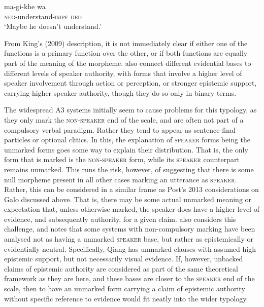 \begin{exe}
        \ex\label{e:Description:DhimalDeductive}
        \gll ma-gi-khe wa \\
        \textsc{neg}-understand-\textsc{impf} \textsc{ded} \\
        \glt `Maybe he doesn't understand.' \cite[Dhimal,][245]{King2009}
\end{exe}

From King's (2009) description, it is not immediately clear if either one of the functions is a primary function over the other, or if both functions are equally part of the meaning of the morpheme.  also connect different evidential bases to different levels of speaker authority, with forms that involve a higher level of speaker involvement through action or perception, or stronger epistemic support, carrying higher speaker authority, though they do so only in binary terms.

The widespread A3 systems initially seem to cause problems for this typology, as they only mark the \textsc{non-speaker} end of the scale, and are often not part of a compulsory verbal paradigm. Rather they tend to appear as sentence-final particles or optional clitics. In this, the explanation of \textsc{speaker} forms being the unmarked forms goes some way to explain their distribution. That is, the only form that is marked is the \textsc{non-speaker} form, while its \textsc{speaker} counterpart remains unmarked. This runs the risk, however, of suggesting that there is some null morpheme present in all other cases marking an utterance as \textsc{speaker}. Rather, this can be considered in a similar frame as Post's 2013 considerations on Galo discussed above. That is, there may be some actual unmarked meaning or expectation that, unless otherwise marked, the speaker does have a higher level of evidence, and subsequently authority, for a given claim.  also considers this challenge, and notes that some systems with non-compulsory marking have been analysed not as having a unmarked \textsc{speaker} base, but rather as epistemically or evidentially neutral. Specifically, Qiang \cite[Qiangic: PRC][197]{LaPolla2003} has unmarked clauses with assumed high epistemic support, but not necessarily visual evidence. If, however, unbacked claims of epistemic authority are considered as part of the same theoretical framework as they are here, and these bases are closer to the \textsc{speaker} end of the scale, then to have an unmarked form carrying a claim of epistemic authority without specific reference to evidence would fit neatly into the wider typology.

